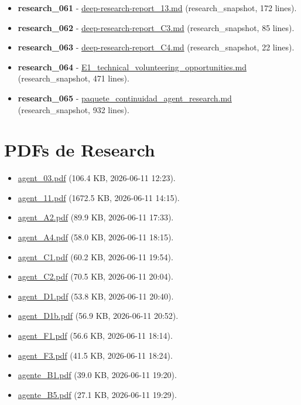 \begin{itemize}
\item \textbf{research\_061} - \href{file:///E:/Laboral/Research/deep-research-report_13.md}{deep-research-report\_13.md} (research\_snapshot, 172 lines).
\item \textbf{research\_062} - \href{file:///E:/Laboral/Research/deep-research-report_C3.md}{deep-research-report\_C3.md} (research\_snapshot, 85 lines).
\item \textbf{research\_063} - \href{file:///E:/Laboral/Research/deep-research-report_C4.md}{deep-research-report\_C4.md} (research\_snapshot, 22 lines).
\item \textbf{research\_064} - \href{file:///E:/Laboral/Research/E1_technical_volunteering_opportunities.md}{E1\_technical\_volunteering\_opportunities.md} (research\_snapshot, 471 lines).
\item \textbf{research\_065} - \href{file:///E:/Laboral/Research/paquete_continuidad_agent_research.md}{paquete\_continuidad\_agent\_research.md} (research\_snapshot, 932 lines).
\end{itemize}


\section{PDFs de Research}


\begin{itemize}
\item \href{file:///E:/Laboral/Research/agent_03.pdf}{agent\_03.pdf} (106.4 KB, 2026-06-11 12:23).
\item \href{file:///E:/Laboral/Research/agent_11.pdf}{agent\_11.pdf} (1672.5 KB, 2026-06-11 14:15).
\item \href{file:///E:/Laboral/Research/agent_A2.pdf}{agent\_A2.pdf} (89.9 KB, 2026-06-11 17:33).
\item \href{file:///E:/Laboral/Research/agent_A4.pdf}{agent\_A4.pdf} (58.0 KB, 2026-06-11 18:15).
\item \href{file:///E:/Laboral/Research/agent_C1.pdf}{agent\_C1.pdf} (60.2 KB, 2026-06-11 19:54).
\item \href{file:///E:/Laboral/Research/agent_C2.pdf}{agent\_C2.pdf} (70.5 KB, 2026-06-11 20:04).
\item \href{file:///E:/Laboral/Research/agent_D1.pdf}{agent\_D1.pdf} (53.8 KB, 2026-06-11 20:40).
\item \href{file:///E:/Laboral/Research/agent_D1b.pdf}{agent\_D1b.pdf} (56.9 KB, 2026-06-11 20:52).
\item \href{file:///E:/Laboral/Research/agent_F1.pdf}{agent\_F1.pdf} (56.6 KB, 2026-06-11 18:14).
\item \href{file:///E:/Laboral/Research/agent_F3.pdf}{agent\_F3.pdf} (41.5 KB, 2026-06-11 18:24).
\item \href{file:///E:/Laboral/Research/agente_B1.pdf}{agente\_B1.pdf} (39.0 KB, 2026-06-11 19:20).
\item \href{file:///E:/Laboral/Research/agente_B5.pdf}{agente\_B5.pdf} (27.1 KB, 2026-06-11 19:29).
\end{itemize}


